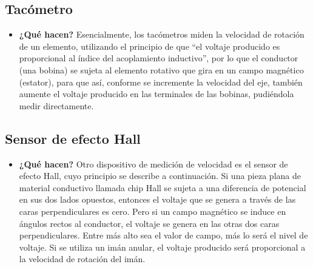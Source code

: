 \subsection*{Tacómetro}
\begin{itemize}
	\item \textbf{¿Qué hacen?} Esencialmente, los tacómetros miden la velocidad de rotación de un elemento, utilizando el principio de que “el voltaje producido es proporcional al índice del acoplamiento inductivo”, por lo que el conductor (una bobina) se sujeta al elemento rotativo que gira en un campo magnético (estator), para que así, conforme se incremente la velocidad del eje, también aumente el voltaje producido en las terminales de las bobinas, pudiéndola medir directamente. 	\cite{BFMX_SensoresInternosRobot} 		
\end{itemize}

	\begin{figure}[h]
	\centering
\end{figure}

\subsection*{Sensor de efecto Hall}
\begin{itemize}
	\item \textbf{¿Qué hacen?} Otro dispositivo de medición de velocidad es el sensor de efecto Hall, cuyo principio se describe a continuación. Si una pieza plana de material conductivo llamada chip Hall se sujeta a una diferencia de potencial en sus dos lados opuestos, entonces el voltaje que se genera a través de las caras perpendiculares es cero. Pero si un campo magnético se induce en ángulos rectos al conductor, el voltaje se genera en las otras dos caras perpendiculares. Entre más alto sea el valor de campo, más lo será el nivel de voltaje. Si se utiliza un imán anular, el voltaje producido será proporcional a la velocidad de rotación del imán. \cite{TE_Connectivity_Sensor}

\end{itemize}

	\begin{figure}[h]
	\centering
\end{figure}

